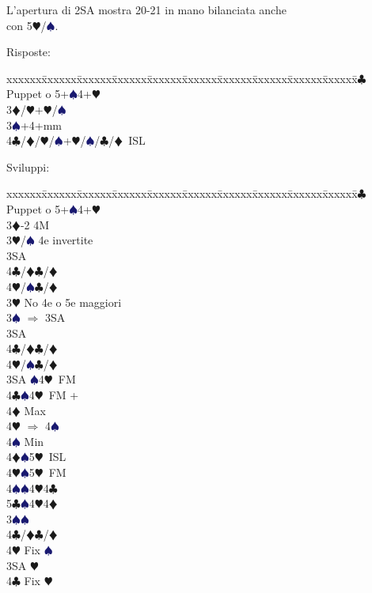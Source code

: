 \documentclass[a4paper,italian]{article}
\newcommand{\BC}{\textcolor{OliveGreen}{$\clubsuit$}}
\newcommand{\BD}{\textcolor{RedOrange}{$\vardiamondsuit$}}
\newcommand{\BH}{\textcolor{Red2}{$\varheartsuit${}}}
\newcommand{\BS}{\textcolor{MidnightBlue}{$\spadesuit${}}}
\newenvironment{bidtable}
{\begin{tabbing}

    xxxxxx\=xxxxxx\=xxxxxx\=xxxxxx\=xxxxxx\=xxxxxx\=xxxxxx\=xxxxxx\=xxxxxx\=xxxxxx\=\kill}
{\end{tabbing} }%
\begin{document}
\begin{multicols}{2}
    L'apertura di 2SA mostra 20-21 in mano bilanciata anche\\con 5\BH/\BS.

    Risposte:

    \begin{bidtable}
        3\BC\> Puppet o 5+\BS4+\BH\\
        3\BD/\BH{}+\BH/\BS\\
        3\BS{}+4+mm\\
        4\BC/\BD/\BH/\BS\>+\BH/\BS/\BC/\BD\ ISL\\
    \end{bidtable}

    Sviluppi:

    \begin{bidtable}
        3\BC \> Puppet o 5+\BS 4+\BH \+\\
        3\BD {}-2 4M\+\\
        3\BH/\BS \> 4e invertite\+\\
        3SA\+\\
        4\BC/\BD {}\BC /\BD \\
        4\BH/\BS {}\BC /\BD \-\-\-\\
        3\BH \> No 4e o 5e maggiori\+\\
        3\BS \> $\Rightarrow$ 3SA\+\\
        3SA\+\\
        4\BC/\BD {}\BC /\BD \\
        4\BH/\BS {}\BC /\BD \-\-\\
        3SA \BS 4\BH\ FM\\
        4\BC {}\BS 4\BH\ FM +\+\\
        4\BD \> Max\+\\
        4\BH \> $\Rightarrow$ 4\BS \-\\
        4\BS \> Min\-\\
        4\BD {}\BS 5\BH\ ISL\\
        4\BH {}\BS 5\BH\ FM\\
        4\BS {}\BS 4\BH 4\BC \\
        5\BC {}\BS 4\BH 4\BD \-\\
        3\BS {}\BS \+\\
        4\BC/\BD {}\BC /\BD \\
        4\BH \> Fix \BS \-\\
        3SA \BH \+\\
        4\BC \> Fix \BH \\

\end{bidtable}
\end{multicols}
\end{document}
